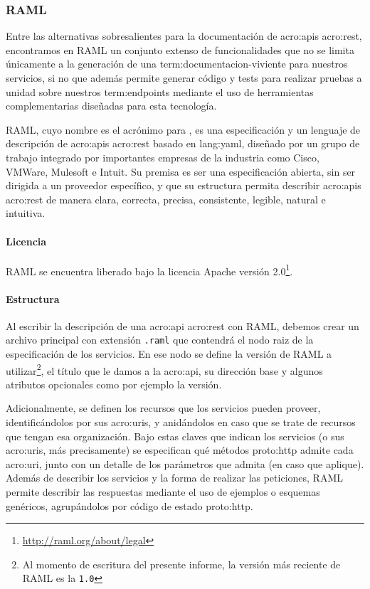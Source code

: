 \subsubsection{RAML}
\label{soa:tecnologias:raml}

Entre las alternativas sobresalientes para la documentación de \glspl{acro:api} \gls{acro:rest}, encontramos en RAML un conjunto extenso de funcionalidades que no se limita únicamente a la generación de una \gls{term:documentacion-viviente} para nuestros servicios, si no que además permite generar código y tests para realizar pruebas a unidad sobre nuestros \glspl{term:endpoint} mediante el uso de herramientas complementarias diseñadas para esta tecnología.

RAML, cuyo nombre es el acrónimo para , es una especificación y un lenguaje de descripción de \glspl{acro:api} \gls{acro:rest} basado en \gls{lang:yaml}, diseñado por un grupo de trabajo integrado por importantes empresas de la industria como Cisco, VMWare, Mulesoft e Intuit. Su premisa es ser una especificación abierta, sin ser dirigida a un proveedor específico, y que su estructura permita describir \glspl{acro:api} \gls{acro:rest} de manera clara, correcta, precisa, consistente, legible, natural e intuitiva.

\paragraph{Licencia}

RAML se encuentra liberado bajo la licencia Apache versión 2.0\footnote{\url{http://raml.org/about/legal}}.

\paragraph{Estructura}

Al escribir la descripción de una \gls{acro:api} \gls{acro:rest} con RAML, debemos crear un archivo principal con extensión \texttt{.raml} que contendrá el nodo raiz de la especificación de los servicios. En ese nodo se define la versión de RAML a utilizar\footnote{Al momento de escritura del presente informe, la versión más reciente de RAML es la \texttt{1.0}}, el título que le damos a la \gls{acro:api}, su dirección base y algunos atributos opcionales como por ejemplo la versión.

Adicionalmente, se definen los recursos que los servicios pueden proveer, identificándolos por sus \glspl{acro:uri}, y anidándolos en caso que se trate de recursos que tengan esa organización. Bajo estas claves que indican los servicios (o sus \glspl{acro:uri}, más precisamente) se especifican qué métodos \gls{proto:http} admite cada \gls{acro:uri}, junto con un detalle de los parámetros que admita (en caso que aplique). Además de describir los servicios y la forma de realizar las peticiones, RAML permite describir las respuestas mediante el uso de ejemplos o esquemas genéricos, agrupándolos por código de estado \gls{proto:http}.

